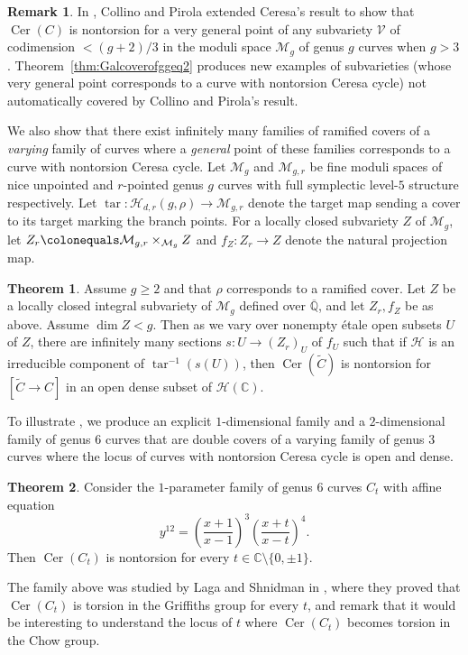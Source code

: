 \documentclass[reqno,10pt]{amsart}
\theoremstyle{definition}
\newtheorem{thm}{Theorem}[section]
\theoremstyle{definition}
\newtheorem*{rems}{Remark}
\def\C{{\mathbb C}}
\def\C{{\mathbb C}}
\def\Qbar{\overline{\mathbb{Q}}}
\DeclareMathOperator{\tar}{tar}
\newcommand{\Cer}{\operatorname{Cer}}
\begin{document}
\begin{rems}
    In \cite[Theorem~4.4.1]{ColPir}, Collino and Pirola extended Ceresa's result to show that $\Cer(C)$ is nontorsion for a very general point of any subvariety $\mathcal{V}$ of codimension $ < (g+2)/3$ in the moduli space $\mathcal{M}_g$ of genus $g$ curves when $g > 3$. Theorem~\ref{thm:Galcoverofggeq2} produces new examples of subvarieties (whose very general point corresponds to a curve with nontorsion Ceresa cycle) not automatically covered by Collino and Pirola's result.
\end{rems}

We also show that there exist infinitely many families of ramified covers of a {\textit{varying}} family of curves where a {\textit{general}} point of these families corresponds to a curve with nontorsion Ceresa cycle. Let $\mathcal{M}_g$ and $\mathcal{M}_{g,r}$ be fine moduli spaces of nice unpointed and $r$-pointed genus $g$ curves with  full symplectic level-$5$ structure respectively. Let $\tar \colon \mathcal{H}_{d,r}(g,\rho) \rightarrow \mathcal{M}_{g,r}$ denote the target map sending a cover to its target marking the branch points. For a locally closed subvariety $Z$ of $\mathcal{M}_g$, let $Z_r \colonequals \mathcal{M}_{g,r} \times_{\mathcal{M}_g} Z$ and $f_Z \colon Z_r \rightarrow Z$ denote the natural projection map. 

\begin{thm}\label{T:CerMMgen} Assume $g \geq 2$ and that $\rho$ corresponds to a ramified cover. Let $Z$ be a locally closed integral subvariety of $\mathcal{M}_g$ defined over $\Qbar$, and let $Z_r,f_Z$ be as above. Assume $\dim Z < g$. Then as we vary over nonempty \'{e}tale open subsets $U$ of $Z$, there are infinitely many sections $s \colon U \rightarrow ({Z_r})_U$ of $f_U$ such that if  $\mathcal{H}$ is an irreducible component of $\tar^{-1}(s(U))$, 
then  $\Cer(\widetilde{C})$ is nontorsion for $[\widetilde{C}\rightarrow C]$ in an open dense subset of $\mathcal{H}(\C)$. 
\end{thm}



To illustrate , we produce an explicit $1$-dimensional family and a $2$-dimensional family of genus $6$ curves that are double covers of a varying family of genus $3$ curves where the locus  of curves with nontorsion Ceresa cycle is open and dense.  
\begin{thm}\label{T:CerMM2}
 Consider the $1$-parameter family of genus $6$ curves $C_t$ with affine equation 
 \[ y^{12} = \left( \frac{x+1}{x-1} \right)^3 \left( \frac{x+t}{x-t} \right)^4. \]
 Then $\Cer(C_t)$ is nontorsion for every $t \in \C \setminus \{0,\pm 1\}$.
\end{thm}
The family above was studied by Laga and Shnidman in \cite[Example~3.9]{AriJef2}, where they proved that $\Cer(C_t)$ is torsion in the Griffiths group for every $t$, and remark that it would be interesting to understand the locus of $t$ where $\Cer(C_t)$ becomes torsion in the Chow group. 
\end{document}
